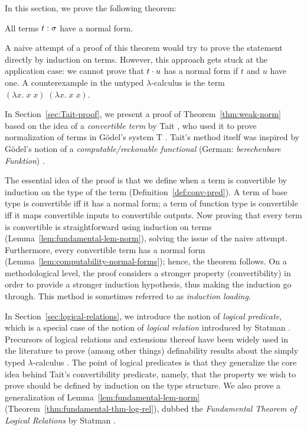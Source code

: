 In this section, we prove the following theorem:

\begin{thm} \label{thm:weak-norm}
All terms $t : \sigma$ have a normal form.
\end{thm}

A naive attempt of a proof of this theorem would try to prove the statement directly by induction on terms. However, this approach gets stuck at the application case: we cannot prove that $t \cdot u$ has a normal form if $t$ and $u$ have one. A counterexample in the untyped $\lambda$-calculus is the term $(\lambda x.\; x\; x)\; (\lambda x.\; x\; x)$.

In Section~\ref{sec:Tait-proof}, we present a proof of Theorem~\ref{thm:weak-norm} based on the idea of a \textit{convertible term} by Tait \cite{tait:1967:jsl}, who used it to prove normalization of terms in Gödel's system T \cite{godel1958}. Tait's method itself was inspired by Gödel's notion of a \textit{computable/reckonable functional} (German: \textit{berechenbare Funktion}) \cite{godel1958}.

The essential idea of the proof is that we define when a term is convertible by induction on the type of the term (Definition~\ref{def:conv-pred}). A term of base type is convertible iff it has a normal form; a term of function type is convertible iff it maps convertible inputs to convertible outputs. Now proving that every term is convertible is straightforward using induction on terms (Lemma~\ref{lem:fundamental-lem-norm}), solving the issue of the naive attempt. Furthermore, every convertible term has a normal form (Lemma~\ref{lem:computability-normal-forms}); hence, the theorem follows. On a methodological level, the proof considers a stronger property (convertibility) in order to provide a stronger induction hypothesis, thus making the induction go through. This method is sometimes referred to as \textit{induction loading}.

In Section~\ref{sec:logical-relations}, we introduce the notion of \textit{logical predicate}, which is a special case of the notion of \textit{logical relation} introduced by Statman \cite{statman:1985:ic}. Precursors of logical relations and extensions thereof have been widely used in the literature to prove (among other things) definability results about the simply typed $\lambda$-calculus \cite{plotkin:1980, statman:1985:ic, jung:1993:tlca, DBLP:conf/tlca/FioreS99}. The point of logical predicates is that they generalize the core idea behind Tait's convertibility predicate, namely, that the property we wish to prove should be defined by induction on the type structure. We also prove a generalization of Lemma~\ref{lem:fundamental-lem-norm} (Theorem~\ref{thm:fundamental-thm-log-rel}), dubbed the \textit{Fundamental Theorem of Logical Relations} by Statman \cite{statman:1985:ic}.

